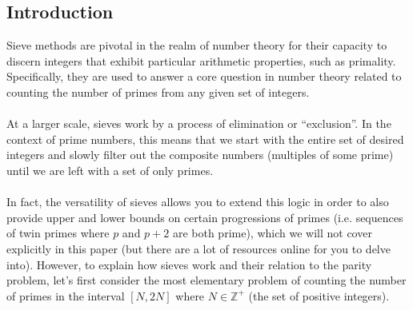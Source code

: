 \documentclass[10pt]{extarticle}
\begin{document}
\subsection{Introduction}
Sieve methods are pivotal in the realm of number theory for their capacity to discern integers that exhibit particular arithmetic properties, such as primality. 
Specifically, they are used to answer a core question in number theory related to counting the number of primes from any given set of integers. \\
\\
At a larger scale, sieves work by a process of elimination or ``exclusion''. In the context of prime numbers, this means that we start with the entire set of desired integers and slowly filter out the composite numbers (multiples of some prime) until we are left with a set of only primes. \\
\\
In fact, the versatility of sieves allows you to extend this logic in order to also provide upper and lower bounds on certain progressions of primes (i.e. sequences of twin primes where $p$ and $p+2$ are both prime), which we will not cover explicitly in this paper (but there are a lot of resources online for you to delve into).
However, to explain how sieves work and their relation to the parity problem, let's first consider the most elementary problem of counting the number of primes in the interval $[N, 2N]$ where $N \in \mathbb{Z}^+$ (the set of positive integers). 
\end{document}
